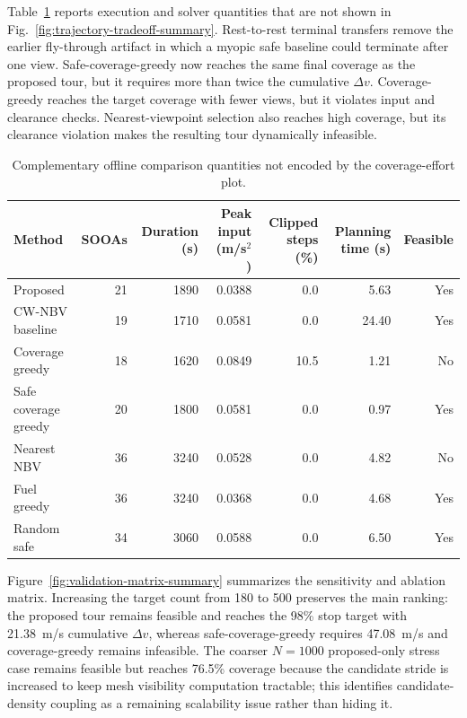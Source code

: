 Table~\ref{tab:method-execution-results} reports execution and solver
quantities that are not shown in
Fig.~\ref{fig:trajectory-tradeoff-summary}. Rest-to-rest terminal transfers
remove the earlier fly-through artifact in which a myopic safe baseline could
terminate after one view. Safe-coverage-greedy now reaches the same final
coverage as the proposed tour, but it requires more than twice the cumulative
$\Delta v$. Coverage-greedy reaches the target coverage with fewer views, but
it violates input and clearance checks. Nearest-viewpoint selection also
reaches high coverage, but its clearance violation makes the resulting tour
dynamically infeasible.

\begin{table}[t]
  \centering
  \caption{Complementary offline comparison quantities not encoded by the
  coverage-effort plot.}
  \label{tab:method-execution-results}
  \renewcommand{\arraystretch}{1.08}
  \setlength{\tabcolsep}{5.0pt}
  \begin{tabular}{lrrrrrr}
    \toprule
    Method & SOOAs & Duration (s) & Peak input (m/s$^2$) &
    Clipped steps (\%) & Planning time (s) & Feasible \\
    \midrule
    Proposed & 21 & 1890 & 0.0388 & 0.0 & 5.63 & Yes \\
    CW-NBV baseline & 19 & 1710 & 0.0581 & 0.0 & 24.40 & Yes \\
    Coverage greedy & 18 & 1620 & 0.0849 & 10.5 & 1.21 & No \\
    Safe coverage greedy & 20 & 1800 & 0.0581 & 0.0 & 0.97 & Yes \\
    Nearest NBV & 36 & 3240 & 0.0528 & 0.0 & 4.82 & No \\
    Fuel greedy & 36 & 3240 & 0.0368 & 0.0 & 4.68 & Yes \\
    Random safe & 34 & 3060 & 0.0588 & 0.0 & 6.50 & Yes \\
    \bottomrule
  \end{tabular}
\end{table}

Figure~\ref{fig:validation-matrix-summary} summarizes the sensitivity and
ablation matrix. Increasing the target count from 180 to 500 preserves the
main ranking: the proposed tour remains feasible and reaches the 98\% stop
target with 21.38~m/s cumulative $\Delta v$, whereas safe-coverage-greedy
requires 47.08~m/s and coverage-greedy remains infeasible. The coarser
$N=1000$ proposed-only stress case remains feasible but reaches 76.5\%
coverage because the candidate stride is increased to keep mesh visibility
computation tractable; this identifies candidate-density coupling as a
remaining scalability issue rather than hiding it.

